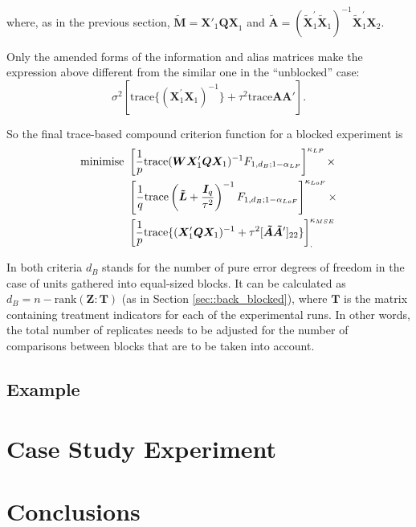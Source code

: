 where, as in the previous section, $\bm{\tilde{M}}=\bm{X}'_{1}\bm{QX}_{1}$ and $\bm{\tilde{A}}=(\bm{\tilde{X}}_1^{'}\bm{\tilde{X}}_1)^{-1}\bm{\tilde{X}}_1^{'}\bm{X}_2$. 

Only the amended forms of the information and alias matrices make the expression above different from the similar one in the ``unblocked'' case:
\begin{equation*}
\sigma^2[\mbox{trace}\{(\bm{X}_1^{'}\bm{X}_1)^{-1}\}+\tau^2\mbox{trace}\bm{A}\bm{A}'].
\end{equation*}

So the final trace-based compound criterion function for a blocked experiment is
\begin{align}
\label{eq::MSE_L_B}
\mbox{minimise }&\left[\frac{1}{p}\mbox{trace}(\bm{WX}'_{1}\bm{Q}\bm{X}_{1})^{-1}F_{1,d_B;1-\alpha_{LP}}\right]^{\kappa_{LP}}\times \notag \\&\left[\frac{1}{q}\mbox{trace}\left(\bm{\tilde{L}}+\frac{\bm{I}_{q}}{\tau^{2}}\right)^{-1}F_{1,d_B;1-\alpha_{LoF}}\right]^{\kappa_{LoF}}\times \notag \\& \left[\frac{1}{p}\mbox{trace}\{(\bm{X}'_{1}\bm{QX}_{1})^{-1}+\tau^2[\bm{\tilde{A}}\bm{\tilde{A}}']_{22}\}\right]^{\kappa_{MSE}}_{.}
\end{align}

In both criteria $d_B$ stands for the number of pure error degrees of freedom in the case of units gathered into equal-sized blocks. It can be calculated as $d_B=n-\mbox{rank}(\bm{Z}:\bm{T})$ (as in Section \ref{sec::back_blocked}), where $\bm{T}$ is the matrix containing treatment indicators for each of the experimental runs. In other words, the total number of replicates needs to be adjusted for the number of comparisons between blocks that are to be taken into account.

\subsection{Example}


\newpage
\section{Case Study Experiment}
\label{sec::case_study}


\section{Conclusions}

